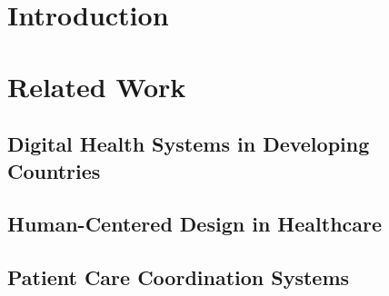 \documentclass[manuscript, screen, review]{acmart}
\begin{document}
\section{Introduction}
%


\section{Related Work}

\subsection{Digital Health Systems in Developing Countries}

\subsection{Human-Centered Design in Healthcare}

\subsection{Patient Care Coordination Systems}
\end{document}

